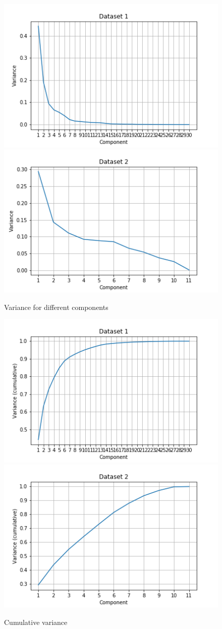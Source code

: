 \documentclass[letterpaper]{article}
\begin{document}
	\begin{figure}
		\centering
		\begin{minipage}{.5\textwidth}
			\centering
			\includegraphics[width=.5\linewidth]{../../plots/pca_var_1}%
			\centering
			\includegraphics[width=.5\linewidth]{../../plots/pca_var_2}
			\caption{Variance for different components}
			\label{fig:pca_var}
		\end{minipage}%
		\begin{minipage}{.5\textwidth}
			\centering
			\includegraphics[width=.5\linewidth]{../../plots/pca_var_cum_1}%
			\centering
			\includegraphics[width=.5\linewidth]{../../plots/pca_var_cum_2}
			\caption{Cumulative variance}
			\label{fig:pca_cum_var}
		\end{minipage}
	\end{figure}
	
\end{document}
